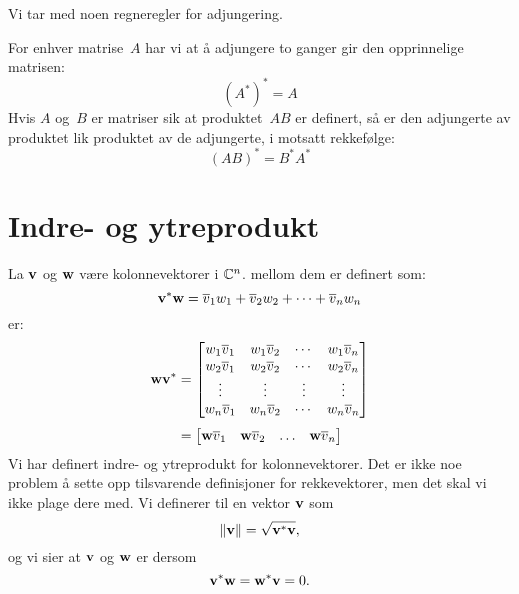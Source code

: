 \noindent Vi tar med noen regneregler for adjungering.

\begin{thm}
For enhver matrise~$A$ har vi at å adjungere to ganger gir den
opprinnelige matrisen:
\[
(A^*)^* = A
\]
Hvis $A$ og~$B$ er matriser sik at produktet~$AB$ er definert, så er
den adjungerte av produktet lik produktet av de adjungerte, i
motsatt rekkefølge:
\[
(AB)^* = B^* A^*
\]
\end{thm}


\section*{Indre- og ytreprodukt}
La $\mathbf{v}$ og $\mathbf{w}$ være kolonnevektorer i $\mathbb{C}^n$. 
 mellom dem er definert som:
\[
\mathbf{v}^* \mathbf{w}= \overline v_1 w_1 + \overline v_2 w_2 + \cdots +\overline v_n w_n
 \] 
  er:
\begin{align*}
 \mathbf{w} \mathbf{v}^*&=
\begin{bmatrix}
w_1 \overline v_1       & w_1 \overline v_2             & \cdots & w_1 \overline v_n \\
w_2 \overline v_1     & w_2 \overline v_2              & \cdots & w_2 \overline v_n   \\
\vdots & \vdots & \vdots  & \vdots \\
w_n \overline v_1     & w_n \overline v_2              & \cdots & w_n \overline v_n   \\
\end{bmatrix}
\\[3pt]&=
\begin{bmatrix}
\mathbf{w}  \overline v_1 & \mathbf{w} \overline v_2  & \hdots & \mathbf{w} \overline v_n 
\end{bmatrix}
 \end{align*}  
 Vi har definert indre- og ytreprodukt for kolonnevektorer. 
 Det er ikke noe problem å sette opp tilsvarende definisjoner for rekkevektorer, 
 men det skal vi ikke plage dere med. 
 Vi definerer  til en vektor $\mathbf{v}$ som 
 \[
 \|\mathbf{v}\|=\sqrt{\mathbf{v}^*\mathbf{v}},
 \]
 og vi sier at $\mathbf{v}$ og $\mathbf{w}$ er  dersom 
\[
 \mathbf{v}^*\mathbf{w}=\mathbf{w}^*\mathbf{v} = 0.
 \] 
 

